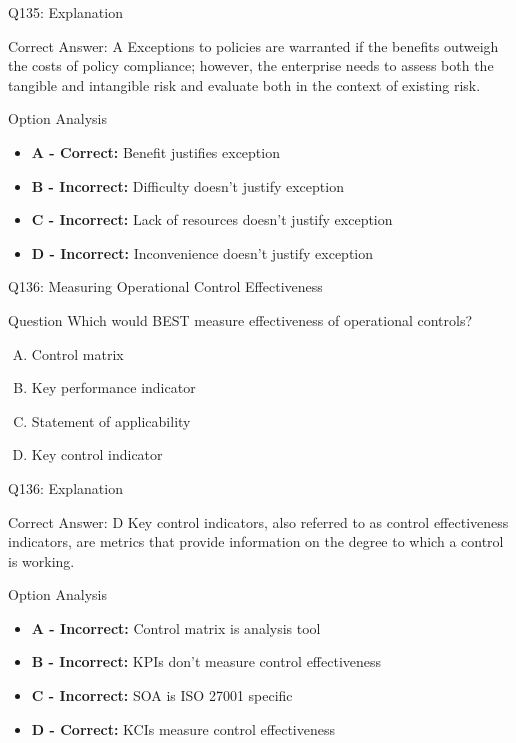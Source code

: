 \documentclass{beamer}
\begin{document}
	\begin{frame}{Q135: Explanation}
		\begin{block}{Correct Answer: A}
			Exceptions to policies are warranted if the benefits outweigh the costs of policy compliance; however, the enterprise needs to assess both the tangible and intangible risk and evaluate both in the context of existing risk.
		\end{block}
		\begin{block}{Option Analysis}
			\begin{itemize}
				\item \textbf{A - Correct:} Benefit justifies exception
				\item \textbf{B - Incorrect:} Difficulty doesn't justify exception
				\item \textbf{C - Incorrect:} Lack of resources doesn't justify exception
				\item \textbf{D - Incorrect:} Inconvenience doesn't justify exception
			\end{itemize}
		\end{block}
	\end{frame}
	
	\begin{frame}{Q136: Measuring Operational Control Effectiveness}
		\begin{block}{Question}
			Which would BEST measure effectiveness of operational controls?
		\end{block}
		\begin{enumerate}[(A)]
			\item Control matrix
			\item Key performance indicator
			\item Statement of applicability
			\item Key control indicator
		\end{enumerate}
	\end{frame}
	
	\begin{frame}{Q136: Explanation}
		\begin{block}{Correct Answer: D}
			Key control indicators, also referred to as control effectiveness indicators, are metrics that provide information on the degree to which a control is working.
		\end{block}
		\begin{block}{Option Analysis}
			\begin{itemize}
				\item \textbf{A - Incorrect:} Control matrix is analysis tool
				\item \textbf{B - Incorrect:} KPIs don't measure control effectiveness
				\item \textbf{C - Incorrect:} SOA is ISO 27001 specific
				\item \textbf{D - Correct:} KCIs measure control effectiveness
			\end{itemize}
		\end{block}
	\end{frame}
	
\end{document}

